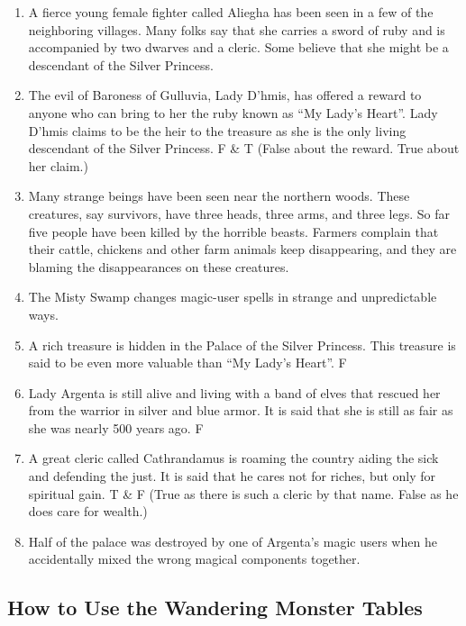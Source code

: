 \documentclass[palace_of_the_silver_princess]{subfiles}
\begin{document}
\begin{enumerate}
	\item A fierce young female fighter called Aliegha has been seen in
		a few of the neighboring villages. Many folks say that she
		carries a sword of ruby and is accompanied by two dwarves and a
		cleric. Some believe that she might be a descendant of the
		Silver Princess.

	\item The evil of Baroness of Gulluvia, Lady D’hmis, has offered a
		reward to anyone who can bring to her the ruby known as “My
		Lady’s Heart”. Lady D’hmis claims to be the heir to the treasure
		as she is the only living descendant of the Silver
		Princess. F \& T (False about the reward. True about her claim.)

	\item Many strange beings have been seen near the northern woods.
		These creatures, say survivors, have three heads, three arms,
		and three legs. So far five people have been killed by the
		horrible beasts. Farmers complain that their cattle, chickens
		and other farm animals keep disappearing, and they are blaming
		the disappearances on these creatures.

	\item The Misty Swamp changes magic-user spells in strange and
		unpredictable ways.

	\item A rich treasure is hidden in the Palace of the Silver
		Princess. This treasure is said to be even more valuable than
		“My Lady’s Heart”. F

	\item Lady Argenta is still alive and living with a band of elves
		that rescued her from the warrior in silver and blue armor. It
		is said that she is still as fair as she was nearly 500 years
		ago. F

	\item A great cleric called Cathrandamus is roaming the country
		aiding the sick and defending the just. It is said that he cares
		not for riches, but only for spiritual gain. T \& F (True as
		there is such a cleric by that name. False as he does care for
		wealth.)

	\item Half of the palace was destroyed by one of Argenta’s magic
		users when he accidentally mixed the wrong magical components
		together.
\end{enumerate}

\subsection{How to Use the Wandering Monster Tables}
\end{document}
